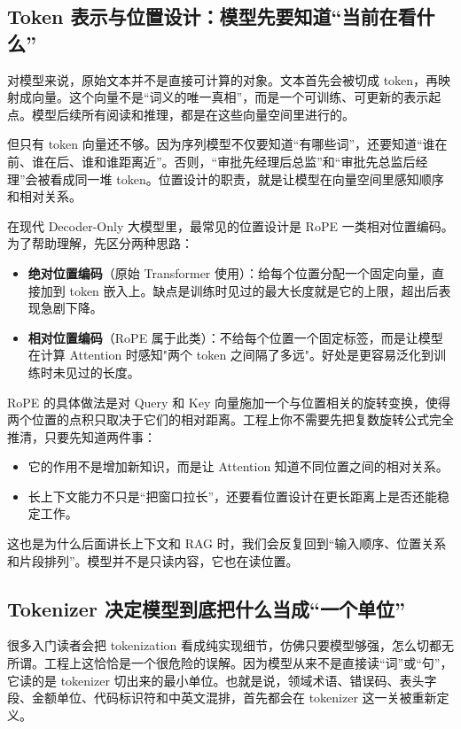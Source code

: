 \subsection{Token 表示与位置设计：模型先要知道“当前在看什么”}
对模型来说，原始文本并不是直接可计算的对象。文本首先会被切成 token，再映射成向量。这个向量不是“词义的唯一真相”，而是一个可训练、可更新的表示起点。模型后续所有阅读和推理，都是在这些向量空间里进行的。

但只有 token 向量还不够。因为序列模型不仅要知道“有哪些词”，还要知道“谁在前、谁在后、谁和谁距离近”。否则，“审批先经理后总监”和“审批先总监后经理”会被看成同一堆 token。位置设计的职责，就是让模型在向量空间里感知顺序和相对关系。

在现代 Decoder-Only 大模型里，最常见的位置设计是 RoPE 一类相对位置编码。为了帮助理解，先区分两种思路：

\begin{itemize}
  \item \textbf{绝对位置编码}（原始 Transformer 使用）：给每个位置分配一个固定向量，直接加到 token 嵌入上。缺点是训练时见过的最大长度就是它的上限，超出后表现急剧下降。
  \item \textbf{相对位置编码}（RoPE 属于此类）：不给每个位置一个固定标签，而是让模型在计算 Attention 时感知"两个 token 之间隔了多远"。好处是更容易泛化到训练时未见过的长度。
\end{itemize}

RoPE 的具体做法是对 Query 和 Key 向量施加一个与位置相关的旋转变换，使得两个位置的点积只取决于它们的相对距离。工程上你不需要先把复数旋转公式完全推清，只要先知道两件事：
\begin{itemize}
  \item 它的作用不是增加新知识，而是让 Attention 知道不同位置之间的相对关系。
  \item 长上下文能力不只是“把窗口拉长”，还要看位置设计在更长距离上是否还能稳定工作。
\end{itemize}

这也是为什么后面讲长上下文和 RAG 时，我们会反复回到“输入顺序、位置关系和片段排列”。模型并不是只读内容，它也在读位置。

\subsection{Tokenizer 决定模型到底把什么当成“一个单位”}
很多入门读者会把 tokenization 看成纯实现细节，仿佛只要模型够强，怎么切都无所谓。工程上这恰恰是一个很危险的误解。因为模型从来不是直接读“词”或“句”，它读的是 tokenizer 切出来的最小单位。也就是说，领域术语、错误码、表头字段、金额单位、代码标识符和中英文混排，首先都会在 tokenizer 这一关被重新定义。

